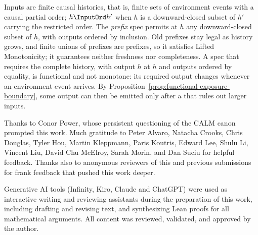 Inputs are finite causal histories, that is, finite sets of environment events with a
causal partial order; $h\InputOrd h'$ when $h$ is a downward-closed subset of
$h'$ carrying the restricted order.  The \emph{prefix} spec permits
at $h$ any downward-closed subset of $h$, with outputs ordered by inclusion.
Old prefixes stay legal as history grows, and finite unions of prefixes are
prefixes, so it satisfies Lifted Monotonicity; it guarantees neither freshness
nor completeness.  A spec that requires the complete history, with
output $h$ at $h$ and outputs ordered by equality, is functional and not
monotone: its required output changes whenever an environment event arrives.  By
Proposition~\ref{prop:functional-exposure-boundary}, some output can then be
emitted only after a \commitment that rules out larger inputs.

\begin{acks}
Thanks to Conor Power, whose persistent questioning of the CALM canon prompted this work.
Much gratitude to Peter Alvaro, Natacha Crooks, Chris Douglas, Tyler Hou, Martin
Kleppmann, Paris Koutris, Edward Lee, Shulu Li, Vincent Liu, David Chu McElroy,
Sarah Morin, and Dan Suciu for helpful feedback. Thanks also to
anonymous reviewers of this and previous submissions for frank feedback that pushed
this work deeper.

Generative AI tools (Infinity, Kiro, Claude and ChatGPT) were used as interactive writing and
reviewing assistants during the preparation of this work, including drafting
and revising text, and synthesizing Lean proofs for all mathematical arguments.  All
content was reviewed, validated, and approved by the author.
\end{acks}
